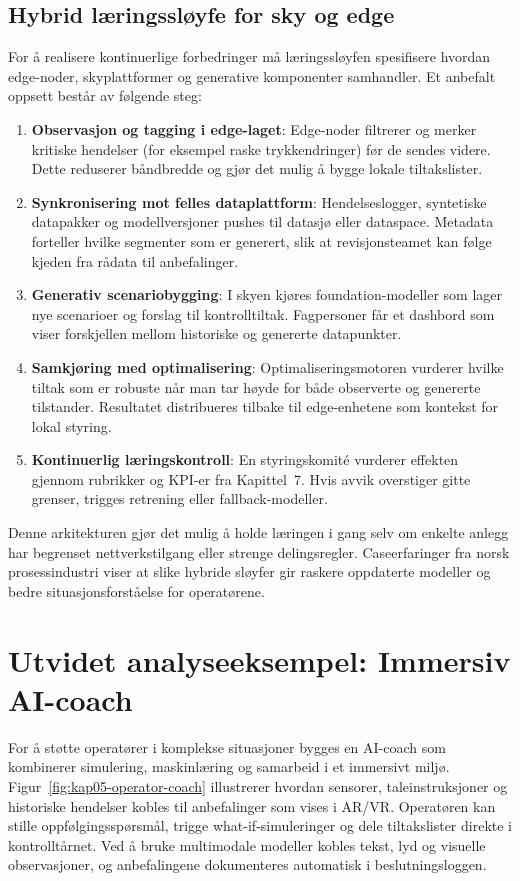 \subsection{Hybrid læringssløyfe for sky og edge}
For å realisere kontinuerlige forbedringer må læringssløyfen spesifisere hvordan edge-noder, skyplattformer og generative komponenter samhandler. Et anbefalt oppsett består av følgende steg:
\begin{enumerate}
    \item \textbf{Observasjon og tagging i edge-laget}: Edge-noder filtrerer og merker kritiske hendelser (for eksempel raske trykkendringer) før de sendes videre. Dette reduserer båndbredde og gjør det mulig å bygge lokale tiltakslister.
    \item \textbf{Synkronisering mot felles dataplattform}: Hendelseslogger, syntetiske datapakker og modellversjoner pushes til datasjø eller dataspace. Metadata forteller hvilke segmenter som er generert, slik at revisjonsteamet kan følge kjeden fra rådata til anbefalinger.
    \item \textbf{Generativ scenariobygging}: I skyen kjøres foundation-modeller som lager nye scenarioer og forslag til kontrolltiltak. Fagpersoner får et dashbord som viser forskjellen mellom historiske og genererte datapunkter.
    \item \textbf{Samkjøring med optimalisering}: Optimaliseringsmotoren vurderer hvilke tiltak som er robuste når man tar høyde for både observerte og genererte tilstander. Resultatet distribueres tilbake til edge-enhetene som kontekst for lokal styring.
    \item \textbf{Kontinuerlig læringskontroll}: En styringskomité vurderer effekten gjennom rubrikker og KPI-er fra Kapittel~7. Hvis avvik overstiger gitte grenser, trigges retrening eller fallback-modeller.
\end{enumerate}
Denne arkitekturen gjør det mulig å holde læringen i gang selv om enkelte anlegg har begrenset nettverkstilgang eller strenge delingsregler. Caseerfaringer fra norsk prosessindustri viser at slike hybride sløyfer gir raskere oppdaterte modeller og bedre situasjonsforståelse for operatørene.\citep{kongsberg2023kognitwin}

\section{Utvidet analyseeksempel: Immersiv AI-coach}
For å støtte operatører i komplekse situasjoner bygges en AI-coach som kombinerer simulering, maskinlæring og samarbeid i et immersivt miljø. Figur~\ref{fig:kap05-operator-coach} illustrerer hvordan sensorer, taleinstruksjoner og historiske hendelser kobles til anbefalinger som vises i AR/VR. Operatøren kan stille oppfølgingsspørsmål, trigge what-if-simuleringer og dele tiltakslister direkte i kontrolltårnet. Ved å bruke multimodale modeller kobles tekst, lyd og visuelle observasjoner, og anbefalingene dokumenteres automatisk i beslutningsloggen.

